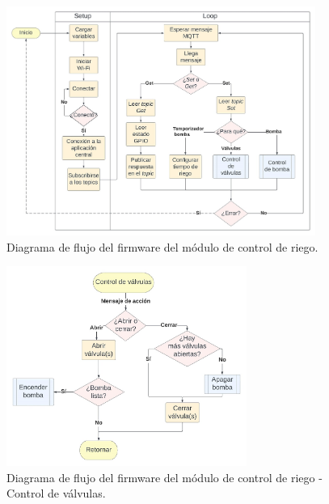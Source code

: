 \begin{figure}[!h]
	\centering
	\includegraphics[width=0.9\textwidth]{./Figures/chapter3/FirmwareRiegoControl.jpg}
	\caption[Diagrama de flujo del firmware del módulo de control de riego]{Diagrama de flujo del firmware del módulo de control de riego.}
	\label{fig:flow_riegocontrol}
\end{figure}

\begin{figure}[!h]
	\centering
	\includegraphics[width=0.7\textwidth]{./Figures/chapter3/FirmwareValveControl.jpg}
	\caption[Diagrama de flujo del firmware del módulo de control de riego - Control de válvulas]{Diagrama de flujo del firmware del módulo de control de riego - Control de válvulas.}
	\label{fig:flow_valvecontrol}
\end{figure}

